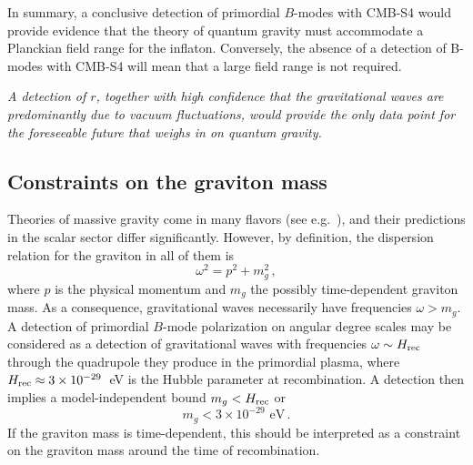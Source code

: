 In summary, a conclusive detection of primordial $B$-modes with CMB-S4 would provide evidence that the theory of quantum gravity must accommodate a Planckian field range for the inflaton. Conversely, the absence of a detection of B-modes with CMB-S4 will mean that a large field range is not required. 

{\it A detection of $r$, together with high confidence that the gravitational waves are predominantly due to vacuum fluctuations, would provide the only data point for the foreseeable future that weighs in on quantum gravity.}

\subsection{Constraints on the graviton mass}

Theories of massive gravity come in many flavors (see e.g.~\cite{Dubovsky:2004sg,Hinterbichler:2011tt}), and their predictions in the scalar sector differ significantly. However, by definition, the dispersion relation for the graviton in all of them is
\begin{equation}
\omega^2=p^2+m_g^2\,,
\end{equation}
where $p$ is the physical momentum and $m_g$ the possibly time-dependent graviton mass. As a consequence, gravitational waves necessarily have frequencies $\omega>m_g$. A detection of primordial $B$-mode polarization on angular degree scales may be considered as a detection of gravitational waves with frequencies $\omega\sim H_{\rm rec}$ through the quadrupole they produce in the primordial plasma, where $H_{\rm rec}\approx 3\times 10^{-29}$~eV is the Hubble parameter at recombination. A detection then implies a model-independent bound $m_g<H_{\rm rec}$ or 
\begin{equation}
m_g< 3\times 10^{-29}{\mbox{ eV}}\,.
\end{equation}
If the graviton mass is time-dependent, this should be interpreted as a constraint on the graviton mass around the time of recombination.

